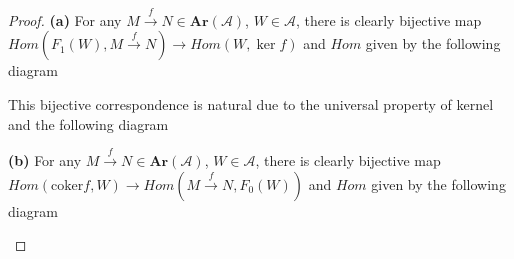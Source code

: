 \documentclass{article}
\theoremstyle{definition}
\theoremstyle{remark}
\theoremstyle{definition}
\begin{document}
\begin{proof}
\textbf{(a) }For any $M\xrightarrow{f}N\in\mathbf{Ar}(\mathscr A)$, $W\in\mathscr A$, there is clearly bijective map $Hom(F_1(W),M\xrightarrow{f}N)\to Hom(W,\ker f)$ and $Hom$ given by the following diagram
\begin{center}
\end{center}
This bijective correspondence is natural due to the universal property of kernel and the following diagram
\begin{center}
\end{center}
\textbf{(b) }For any $M\xrightarrow{f}N\in\mathbf{Ar}(\mathscr A)$, $W\in\mathscr A$, there is clearly bijective map $Hom(\mathrm{coker} f,W)\to Hom(M\xrightarrow{f}N,F_0(W))$ and $Hom$ given by the following diagram
\begin{center}
\end{center}
\end{proof}
\end{document}
